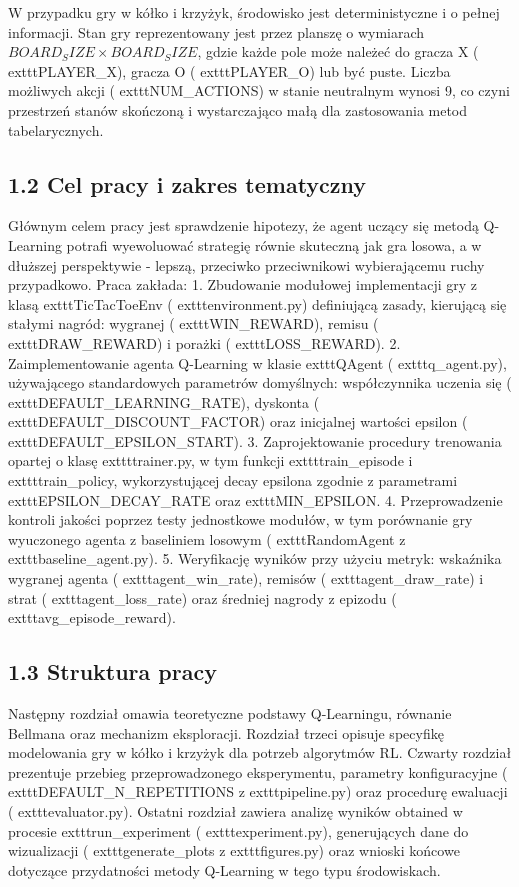 \documentclass[conference]{IEEEtran}
\begin{document}
W przypadku gry w kółko i krzyżyk, środowisko jest deterministyczne i o pełnej informacji. Stan gry reprezentowany jest przez planszę o wymiarach $BOARD_SIZE \times BOARD_SIZE$, gdzie każde pole może należeć do gracza X ( exttt{PLAYER\_X}), gracza O ( exttt{PLAYER\_O}) lub być puste. Liczba możliwych akcji ( exttt{NUM\_ACTIONS}) w stanie neutralnym wynosi 9, co czyni przestrzeń stanów skończoną i wystarczająco małą dla zastosowania metod tabelarycznych.

\subsection{1.2 Cel pracy i zakres tematyczny}
Głównym celem pracy jest sprawdzenie hipotezy, że agent uczący się metodą Q-Learning potrafi wyewoluować strategię równie skuteczną jak gra losowa, a w dłuższej perspektywie - lepszą, przeciwko przeciwnikowi wybierającemu ruchy przypadkowo. Praca zakłada:
1. Zbudowanie modułowej implementacji gry z klasą  exttt{TicTacToeEnv} ( exttt{environment.py}) definiującą zasady,
kierującą się stałymi nagród: wygranej ( exttt{WIN\_REWARD}), remisu ( exttt{DRAW\_REWARD}) i porażki ( exttt{LOSS\_REWARD}).
2. Zaimplementowanie agenta Q-Learning w klasie  exttt{QAgent} ( exttt{q\_agent.py}), używającego standardowych parametrów domyślnych: współczynnika uczenia się ( exttt{DEFAULT\_LEARNING\_RATE}), dyskonta ( exttt{DEFAULT\_DISCOUNT\_FACTOR}) oraz inicjalnej wartości epsilon ( exttt{DEFAULT\_EPSILON\_START}).
3. Zaprojektowanie procedury trenowania opartej o klasę  exttt{trainer.py}, w tym funkcji  exttt{train\_episode} i  exttt{train\_policy}, wykorzystującej decay epsilona zgodnie z parametrami  exttt{EPSILON\_DECAY\_RATE} oraz  exttt{MIN\_EPSILON}.
4. Przeprowadzenie kontroli jakości poprzez testy jednostkowe modułów, w tym porównanie gry wyuczonego agenta z baseliniem losowym ( exttt{RandomAgent} z  exttt{baseline\_agent.py}).
5. Weryfikację wyników przy użyciu metryk: wskaźnika wygranej agenta ( exttt{agent\_win\_rate}), remisów ( exttt{agent\_draw\_rate}) i strat ( exttt{agent\_loss\_rate}) oraz średniej nagrody z epizodu ( exttt{avg\_episode\_reward}).

\subsection{1.3 Struktura pracy}
Następny rozdział omawia teoretyczne podstawy Q-Learningu, równanie Bellmana oraz mechanizm eksploracji. Rozdział trzeci opisuje specyfikę modelowania gry w kółko i krzyżyk dla potrzeb algorytmów RL. Czwarty rozdział prezentuje przebieg przeprowadzonego eksperymentu, parametry konfiguracyjne ( exttt{DEFAULT\_N\_REPETITIONS} z  exttt{pipeline.py}) oraz procedurę ewaluacji ( exttt{evaluator.py}). Ostatni rozdział zawiera analizę wyników obtained w procesie  exttt{run\_experiment} ( exttt{experiment.py}), generujących dane do wizualizacji ( exttt{generate\_plots} z  exttt{figures.py}) oraz wnioski końcowe dotyczące przydatności metody Q-Learning w tego typu środowiskach.
\end{document}
